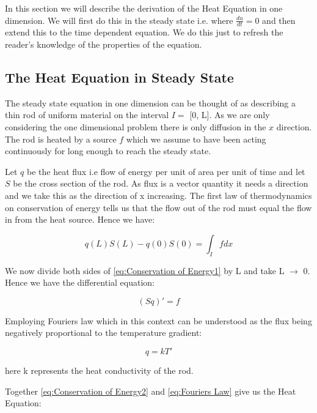 \documentclass{uonmathreport}
\theoremstyle{definition}
\theoremstyle{problem}
\theoremstyle{theorem}
\begin{document}
In this section we will describe the derivation of the Heat Equation in one dimension. We will first do this in the steady state i.e. where $\frac{du}{dt}=0$ and then extend this to the time dependent equation. We do this just to refresh the reader's knowledge of the properties of the equation. 

\subsection{The Heat Equation in Steady State} \label{subsec:Steady State}

The steady state equation in one dimension can be thought of as describing a thin rod of uniform material on the interval $I =$ [0, L]. As we are only considering the one dimensional problem there is only diffusion in the $x$ direction. The rod is heated by a source $f$ which we assume to have been acting continuously for long enough to reach the steady state. 

Let $q$ be the heat flux i.e flow of energy per unit of area per unit of time and let $S$ be the cross section of the rod. As flux is a vector quantity it needs a direction and we take this as the direction of x increasing. The first law of thermodynamics on conservation of energy tells us that the flow out of the rod must equal the flow in from the heat source. Hence we have:

\begin{equation}
q(L)S(L) - q(0)S(0) =  \int_I  f  dx	\label{eq:Conservation of Energy1}
\end{equation}

We now divide both sides of \eqref{eq:Conservation of Energy1} by L and take L $\rightarrow$ 0. Hence we have the differential equation:

\begin{equation}
(Sq)' = f	\label{eq:Conservation of Energy2}
\end{equation}

Employing Fouriers law which in this context can be understood as the flux being negatively proportional to the temperature gradient:

\begin{equation}
q = kT'	\label{eq:Fouriers Law}
\end{equation}

here k represents the heat conductivity of the rod.

Together \eqref{eq:Conservation of Energy2} and \eqref{eq:Fouriers Law} give us the Heat Equation:
\end{document}
